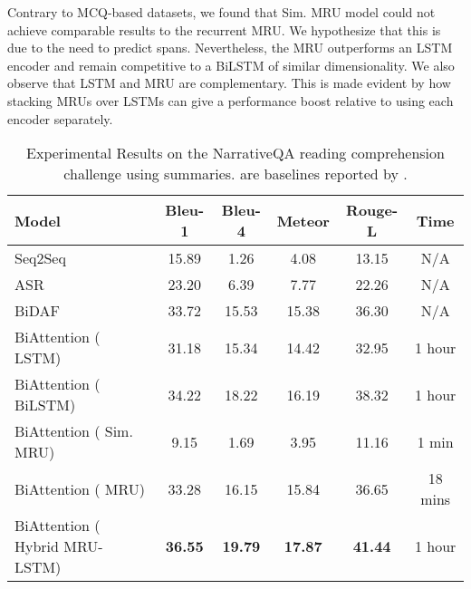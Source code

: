 \documentclass{article}
\begin{document}
Contrary to MCQ-based datasets, we found that Sim. MRU model could not achieve comparable results to the recurrent MRU. We hypothesize that this is due to the need to predict spans. Nevertheless, the  MRU outperforms an LSTM encoder and remain competitive to a BiLSTM of similar dimensionality. We also observe that LSTM and MRU are complementary. This is made evident by how stacking MRUs over LSTMs can give a performance boost relative to using each encoder separately. 














\begin{table*}[t]
  \centering
\small
    \begin{tabular}{|l|cccc|c|}
    \hline
         Model & Bleu-1 & Bleu-4 & Meteor & Rouge-L & Time\\
          \hline
    Seq2Seq & 15.89 & 1.26  & 4.08  & 13.15 & N/A\\
    ASR  \cite{kadlec2016text}   & 23.20  & 6.39  & 7.77  & 22.26 & N/A \\
    BiDAF \cite{seo2016bidirectional}& 33.72 & 15.53 & 15.38 & 36.30  &N/A\\
    \hline
    BiAttention ( LSTM) & 31.18 & 15.34 & 14.42 & 32.95& 1 hour\\
    BiAttention ( BiLSTM) &  34.22 & 18.22 & 16.19 & 38.32 & 1 hour \\
    BiAttention ( Sim. MRU)  &9.15  &1.69 & 3.95 & 11.16 & 1 min \\
    BiAttention ( MRU) & 33.28 & 16.15 & 15.84 & 36.65 & 18 mins\\
    BiAttention ( Hybrid MRU-LSTM) & \textbf{36.55} & \textbf{19.79} & \textbf{17.87} & \textbf{41.44} & 1 hour\\
    \hline
    \end{tabular}

    \caption{Experimental Results on the NarrativeQA reading comprehension challenge \cite{kovcisky2017narrativeqa} using summaries.  are baselines reported by \cite{kovcisky2017narrativeqa}.} 
    \label{tab:narrativeqa}\end{table*}
\end{document}
